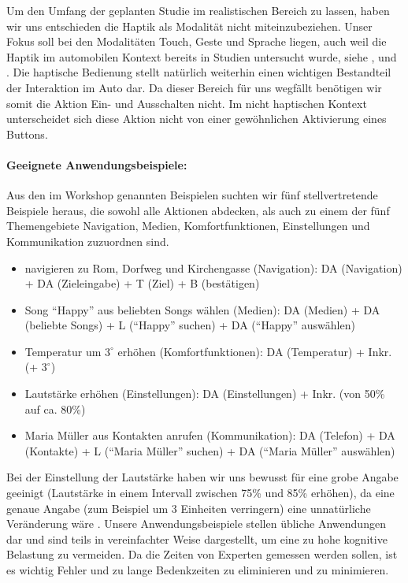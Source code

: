 Um den Umfang der geplanten Studie im realistischen Bereich zu lassen, haben wir uns entschieden die Haptik als Modalität nicht miteinzubeziehen. 
Unser Fokus soll bei den Modalitäten Touch, Geste und Sprache liegen, auch weil die Haptik im automobilen Kontext bereits in Studien untersucht wurde, siehe \citep{Pettitt_2007}, \citep{schneegass_2009} und \citep{SchneegaB_2011}. 
Die haptische Bedienung stellt natürlich weiterhin einen wichtigen Bestandteil der Interaktion im Auto dar. Da dieser Bereich für uns wegfällt benötigen wir somit die Aktion Ein- und Ausschalten nicht. 
Im nicht haptischen Kontext unterscheidet sich diese Aktion nicht von einer gewöhnlichen Aktivierung eines Buttons.
\paragraph{Geeignete Anwendungsbeispiele:}
Aus den im Workshop genannten Beispielen suchten wir fünf stellvertretende Beispiele heraus, die sowohl alle Aktionen abdecken, als auch zu einem der fünf Themengebiete Navigation, Medien, Komfortfunktionen, Einstellungen und Kommunikation zuzuordnen sind. 
\begin{itemize}
\item navigieren zu Rom, Dorfweg und Kirchengasse (Navigation): DA (Navigation) + DA (Zieleingabe) + T (Ziel) + B (bestätigen)
\item Song "`Happy"' aus beliebten Songs wählen (Medien): DA (Medien) + DA (beliebte Songs) + L ("`Happy"' suchen) + DA ("`Happy"' auswählen)
\item Temperatur um $3^\circ$ erhöhen (Komfortfunktionen): DA (Temperatur) + Inkr. (+ $3^\circ$)
\item Lautstärke erhöhen (Einstellungen): DA (Einstellungen) + Inkr. (von 50\% auf ca. 80\%)
\item Maria Müller aus Kontakten anrufen (Kommunikation): DA (Telefon) + DA (Kontakte) + L ("`Maria Müller"' suchen) + DA ("`Maria Müller"' auswählen)
\end{itemize}
Bei der Einstellung der Lautstärke haben wir uns bewusst für eine grobe Angabe geeinigt (Lautstärke in einem Intervall zwischen 75\% und 85\% erhöhen), da eine genaue Angabe (zum Beispiel um 3 Einheiten verringern) eine unnatürliche Veränderung wäre \citep{stracke2014touch}. 
Unsere Anwendungsbeispiele stellen übliche Anwendungen dar und sind teils in vereinfachter Weise dargestellt, um eine zu hohe kognitive Belastung zu vermeiden. 
Da die Zeiten von Experten gemessen werden sollen, ist es wichtig Fehler und zu lange Bedenkzeiten zu eliminieren und zu minimieren.

